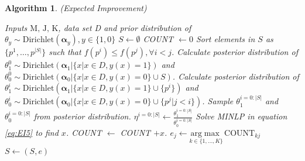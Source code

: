 \documentclass[12pt]{article}
\newtheorem{Algorithm}{Algorithm}
\begin{document}
\begin{Algorithm}(Expected Improvement) \label{algo2}
\begin{algorithmic}[1]
\REQUIRE Inputs $\text{M, J, K}$, data set D and prior distribution of $\theta_y \sim \text{Dirichlet} (\boldsymbol \alpha_y), y \in \{1,0\}$
\STATE $S \leftarrow \emptyset $
\STATE COUNT $\leftarrow 0$
\STATE Sort elements in $S$ as $\{p^1,\ldots,p^{|S|}\}$ such that $f(p^i) \leq f(p^j), \forall i<j$.
\ENDIF
\STATE Calculate posterior distribution of $\theta_1^0 \sim \text{Dirichlet} (\boldsymbol \alpha_1|\{x|x \in D,y(x)=1\})$ and $\theta_0^0 \sim \text{Dirichlet} (\boldsymbol \alpha_0|\{x|x \in D,y(x)=0\} \cup S)$.
\STATE Calculate posterior distribution of $\theta_1^i \sim \text{Dirichlet} (\boldsymbol \alpha_1|\{x|x \in D,y(x)=1\} \cup \{p^i\})$ and $\theta_0^i \sim \text{Dirichlet} (\boldsymbol \alpha_0|\{x|x \in D,y(x)=0\} \cup \{p^j|j<i\})$.
\ENDFOR
\LOOP 
\STATE Sample $\theta_1^{i=0:|S|}$ and $\theta_0^{i=0:|S|}$ from posterior distribution.
\STATE $\eta^{i=0:|S|} \leftarrow \frac{\theta_1^{i=0:|S|}}{\theta_0^{i=0:|S|}}$
\STATE Solve MINLP in equation \eqref{eq:EI5} to find $x$.
\STATE COUNT $\leftarrow$ COUNT $+ x$.
\ENDLOOP
{}
\STATE $e_j \leftarrow \underset{k \in \{1,\ldots,K\}}{\mathrm{arg}\max} \, \text{COUNT}_{kj}$
\ENDFOR
\STATE $S \leftarrow (S, e)$
\ENDFOR
\end{algorithmic}
\end{Algorithm}
\end{document}
